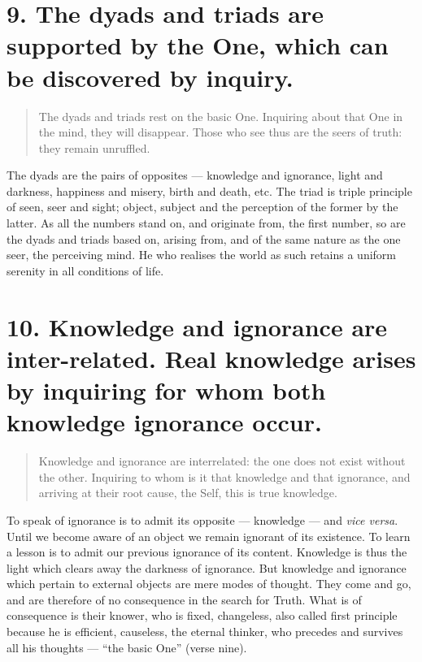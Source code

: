 \documentclass[12pt]{report}
\begin{document}
\section{9. The dyads and triads are supported by the One, which can
  be discovered by inquiry.}

\begin{quote}
  The dyads and triads rest on the basic One. Inquiring about that One
  in the mind, they will disappear. Those who see thus are the seers of
  truth: they remain unruffled.
\end{quote}


The dyads are the pairs of opposites --- knowledge and ignorance,
light and darkness, happiness and misery, birth and death, etc. The
triad is triple principle of seen, seer and sight; object, subject and
the perception of the former by the latter. As all the numbers stand
on, and originate from, the first number, so are the dyads and triads
based on, arising from, and of the same nature as the one seer, the
perceiving mind. He who realises the world as such retains a uniform
serenity in all conditions of life.


\section{10. Knowledge and ignorance are inter-related. Real knowledge
arises by inquiring for whom both knowledge ignorance occur.}

\begin{quote}
  Knowledge and ignorance are interrelated: the one does not exist
  without the other. Inquiring to whom is it that knowledge and that
  ignorance, and arriving at their root cause, the Self, this is true
  knowledge. 
\end{quote}


To speak of ignorance is to admit its opposite --- knowledge --- and
\emph{vice versa}. Until we become aware of an object we remain
ignorant of its existence. To learn a lesson is to admit our previous
ignorance of its content. Knowledge is thus the light which clears
away the darkness of ignorance. But knowledge and ignorance which
pertain to external objects are mere modes of thought. They come and
go, and are therefore of no consequence in the search for Truth. What
is of consequence is their knower, who is fixed, changeless, also
called first principle because he is efficient, causeless, the eternal
thinker, who precedes and survives all his thoughts --- ``the basic
One'' (verse nine).
\end{document}
